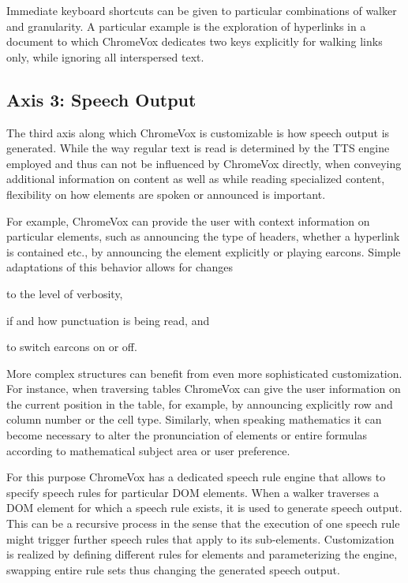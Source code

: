\documentclass{sig-alternate}
\begin{document}
Immediate keyboard shortcuts can be given to particular combinations of walker
and granularity. A particular example is the exploration of hyperlinks in a
document to which ChromeVox dedicates two keys explicitly for walking links
only, while ignoring all interspersed text.

\subsection{Axis 3: Speech Output}
\label{sec:ax3}

The third axis along which ChromeVox is customizable is how speech output is
generated. While the way regular text is read is determined by the TTS engine
employed and thus can not be influenced by ChromeVox directly, when conveying
additional information on content as well as while reading specialized content,
flexibility on how elements are spoken or announced is important.

For example, ChromeVox can provide the user with context information on
particular elements, such as announcing the type of headers, whether a hyperlink
is contained etc., by announcing the element explicitly or playing
earcons. Simple adaptations of this behavior allows for changes
\begin{inparaenum}[(a)]
\item to the level of verbosity,
\item if and how punctuation is being read, and
\item to switch earcons on or off.
\end{inparaenum}

More complex structures can benefit from even more sophisticated customization.
For instance, when traversing tables ChromeVox can give the user information on
the current position in the table, for example, by announcing explicitly row and
column number or the cell type. Similarly, when speaking mathematics it can become
necessary to alter the pronunciation of elements or entire formulas according to
mathematical subject area or user preference.

For this purpose ChromeVox has a dedicated speech rule engine that allows to
specify speech rules for particular DOM elements. When a walker traverses a DOM
element for which a speech rule exists, it is used to generate speech
output. This can be a recursive process in the sense that the execution of one
speech rule might trigger further speech rules that apply to its sub-elements.
Customization is realized by defining different rules for elements and
parameterizing the engine, swapping entire rule sets thus changing the generated
speech output.
\end{document}
